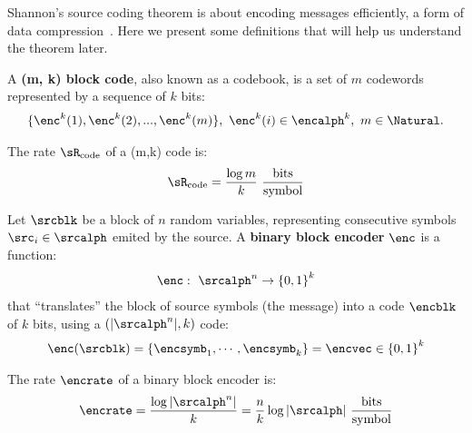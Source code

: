 Shannon's source coding theorem is about encoding messages efficiently, a form of data compression~\cite{stone:2015}. Here we present some definitions that will help us understand the theorem later.

\begin{definition}
A \textbf{(m, k) block code}, also known as a codebook, is a set of \(m\) codewords represented by a sequence of \(k\) bits:
\begin{align}
\{\enc^k(1),\enc^k(2),...,\enc^k(m)\},~\enc^k(i) \in \encalph^k, ~m \in \Natural.
\end{align}
\end{definition}
\begin{definition} The rate \(\sR_{\text{code}}\) of a (m,k) code is:
	\begin{align}
		\sR_{\text{code}} = \frac{\log m}{k}~\frac{\text{bits}}{\text{symbol}}\label{code_rate}
		\end{align}
\end{definition}
\begin{definition}
Let \(\srcblk\) be a block of \(n\) random variables, representing consecutive symbols \(\src_i \in \srcalph\) emited by the source. A \textbf{binary block encoder}  \(\enc\) is a function:
\begin{align}
	\enc:~ \srcalph^n \to {\{0,1\}}^k
\end{align}
that ``translates'' the block of source symbols (the message) into a code \(\encblk\) of \(k\) bits, using a \((|\srcalph^n|, k)\) code:
\begin{align}
	\enc(\srcblk)=\{\encsymb_1,  \cdots, \encsymb_k\}=\encvec \in {\{0,1\}}^k
\end{align}
\end{definition}
\begin{definition} The rate \(\encrate\) of a binary block encoder is:
	\begin{align}
		\encrate = \frac{\log |\srcalph^n|}{k}=\frac{n}{k}\log |\srcalph|~\frac{\text{bits}}{\text{symbol}}
		\end{align}
\end{definition}


